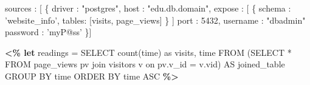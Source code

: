 \begin{figure*}
\centering
%
%
\begin{minipage}[c]{6cm}
\begin{minipage}[c]{6cm}
\begin{code}
   sources : [ \{ 
     driver   : "postgres", 
     host     : "edu.db.domain", 
     expose   : [ \{
      schema : 'website_info', 
      tables: [visits, page_views] \} ]
     port     : 5432, 
     username : "dbadmin" 
     password : 'myP@ss'
   \}] 
\end{code}
\vspace*{-0.4cm}
\vspace*{0.3cm}
\label{figure:source-config-file}
\end{minipage}
%
\begin{minipage}[c]{6cm}
\begin{code}
\textbf{<\% let} readings = 
   SELECT count(time) as visits, time
   FROM (SELECT * FROM page_views pv 
  	     join visitors v 
         on pv.v_id = v.vid) AS joined_table
   GROUP BY time 
   ORDER BY time ASC \textbf{\%>}
\end{code}
\vspace*{-0.4cm}
\label{figure:first-running-example:data-retrieval}
\vspace*{0.3cm}
\end{minipage}


\end{minipage}
\end{figure*}
